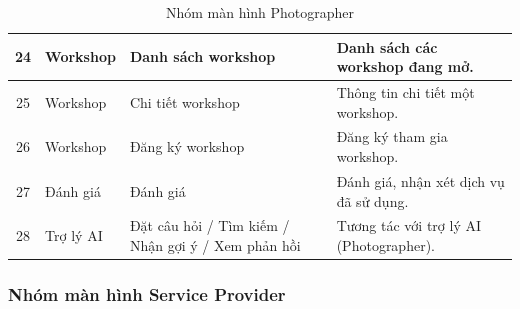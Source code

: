 \begin{table}[H]
\begin{tabular}{|c|p{3cm}|p{4cm}|p{6cm}|}
		\hline
		24 & Workshop & Danh sách workshop &
		Danh sách các workshop đang mở. \\
		\hline
		25 & Workshop & Chi tiết workshop &
		Thông tin chi tiết một workshop. \\
		\hline
		26 & Workshop & Đăng ký workshop &
		Đăng ký tham gia workshop. \\
		\hline
		27 & Đánh giá & Đánh giá &
		Đánh giá, nhận xét dịch vụ đã sử dụng. \\
		\hline
		28 & Trợ lý AI & Đặt câu hỏi / Tìm kiếm / Nhận gợi ý / Xem phản hồi &
		Tương tác với trợ lý AI (Photographer). \\
		\hline
	\end{tabular}
	\caption{Nhóm màn hình Photographer}
	\label{tab:photographer-screen-descriptions}
\end{table}

\subsubsection{Nhóm màn hình Service Provider}

